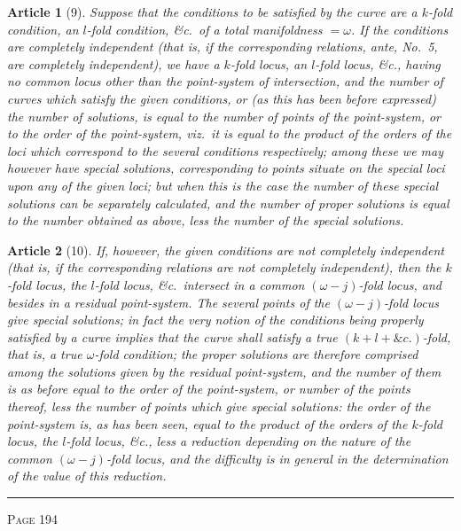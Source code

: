 \documentclass[11pt,a4paper]{article}
\theoremstyle{cayley}
\newtheorem{art}{Article}
\begin{document}
\begin{art}[9]
Suppose that the conditions to be satisfied by the curve are a $k$-fold condition, an $l$-fold condition, \&c.\ of a total manifoldness $= \omega$. If the conditions are completely independent (that is, if the corresponding relations, ante, No.~5, are completely independent), we have a $k$-fold locus, an $l$-fold locus, \&c., having no common locus other than the point-system of intersection, and the number of curves which satisfy the given conditions, or (as this has been before expressed) the number of solutions, is equal to the number of points of the point-system, or to the order of the point-system, viz.\ it is equal to the product of the orders of the loci which correspond to the several conditions respectively; among these we may however have special solutions, corresponding to points situate on the special loci upon any of the given loci; but when this is the case the number of these special solutions can be separately calculated, and the number of proper solutions is equal to the number obtained as above, less the number of the special solutions.
\end{art}

\begin{art}[10]
If, however, the given conditions are not completely independent (that is, if the corresponding relations are not completely independent), then the $k$-fold locus, the $l$-fold locus, \&c.\ intersect in a common $(\omega-j)$-fold locus, and besides in a residual point-system. The several points of the $(\omega-j)$-fold locus give special solutions; in fact the very notion of the conditions being properly satisfied by a curve implies that the curve shall satisfy a true $(k+l+\&c.)$-fold, that is, a true $\omega$-fold condition; the proper solutions are therefore comprised among the solutions given by the residual point-system, and the number of them is as before equal to the order of the point-system, or number of the points thereof, less the number of points which give special solutions: the order of the point-system is, as has been seen, equal to the product of the orders of the $k$-fold locus, the $l$-fold locus, \&c., less a reduction depending on the nature of the common $(\omega-j)$-fold locus, and the difficulty is in general in the determination of the value of this reduction.
\end{art}

\vspace{1em}
\noindent\rule{\textwidth}{0.4pt}
\begin{center}\textsc{Page 194}\end{center}
\newpage
\end{document}
